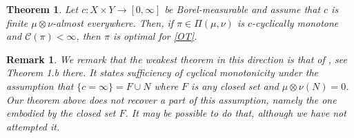 \documentclass[leqno, 11pt, a4paper]{amsart}
\newtheorem{thm}{Theorem}
\newtheorem{rem}{Remark}
\theoremstyle{definition}
\newcommand{\C}{\mathscr{C}}
\begin{document}
\begin{thm}\label{thm:sufficient-ot}
	Let $c : X \times Y \to [0, \infty]$ be Borel-measurable and assume that $c$ is finite $\mu \otimes \nu$-almost everywhere. Then, if $\pi \in \Pi(\mu, \nu)$ is $c$-cyclically monotone and $\C(\pi) < \infty$, then $\pi$ is optimal for \eqref{OT}.
\end{thm}

\begin{rem}
	We remark that the weakest theorem in this direction is that of \cite{beiglbockOptimalBetterTransport2009}, see \textit{Theorem 1.b} there. It states sufficiency of cyclical monotonicity under the assumption that $\{ c = \infty\} = F \cup N$ where $F$ is any closed set and $\mu \otimes \nu(N) = 0$. Our theorem above does not recover a part of this assumption, namely the one embodied by the closed set $F$. It may be possible to do that, although we have not attempted it.
\end{rem}
\end{document}
